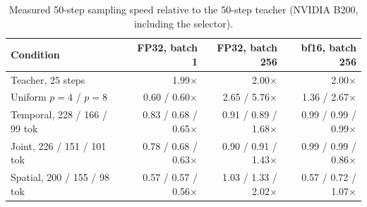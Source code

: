 \begin{table}[t]
\centering
\small
\caption{Measured 50-step sampling speed relative to the 50-step teacher (NVIDIA B200, including the selector).}
\label{tab:latency}
\begin{tabular}{lrrr}
\toprule
Condition & FP32, batch 1 & FP32, batch 256 & bf16, batch 256 \\
\midrule
Teacher, 25 steps & 1.99$\times$ & 2.00$\times$ & 2.00$\times$ \\
Uniform $p{=}4$ / $p{=}8$ & 0.60 / 0.60$\times$ & 2.65 / 5.76$\times$ & 1.36 / 2.67$\times$ \\
Temporal, 228 / 166 / 99 tok & 0.83 / 0.68 / 0.65$\times$ & 0.91 / 0.89 / 1.68$\times$ & 0.99 / 0.99 / 0.99$\times$ \\
Joint, 226 / 151 / 101 tok & 0.78 / 0.68 / 0.63$\times$ & 0.90 / 0.91 / 1.43$\times$ & 0.99 / 0.99 / 0.86$\times$ \\
Spatial, 200 / 155 / 98 tok & 0.57 / 0.57 / 0.56$\times$ & 1.03 / 1.33 / 2.02$\times$ & 0.57 / 0.72 / 1.07$\times$ \\
\bottomrule
\end{tabular}
\end{table}
